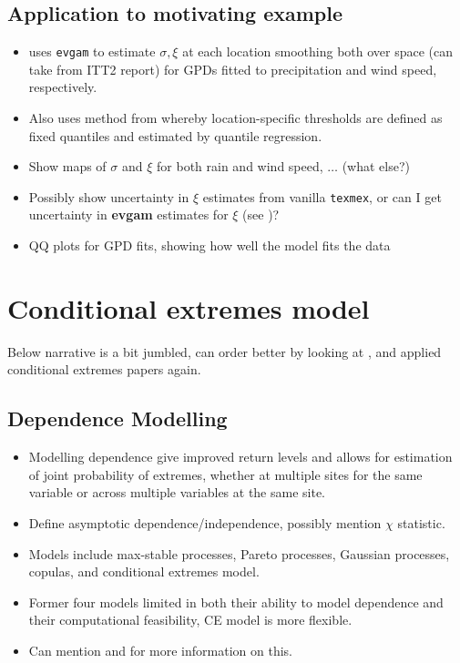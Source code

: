 \documentclass{article}
\numberwithin{equation}{section}
\begin{document}
\subsection{Application to motivating example}
\begin{itemize}
  \item uses \texttt{evgam} to estimate $\sigma, \xi$ at each location smoothing both over space (can take from ITT2 report) for GPDs fitted to precipitation and wind speed, respectively.
  \item Also uses method from \cite{Youngman2019} whereby location-specific thresholds are defined as fixed quantiles and estimated by quantile regression.
  \item Show maps of $\sigma$ and $\xi$ for both rain and wind speed, $\ldots$ (what else?)
  \item Possibly show uncertainty in $\xi$ estimates from vanilla \texttt{texmex}, or can I get uncertainty in \textbf{evgam} estimates for $\xi$ (see \cite{Youngman2023})?
  \item QQ plots for GPD fits, showing how well the model fits the data 
\end{itemize}

\section{Conditional extremes model}\label{sec:ce}

Below narrative is a bit jumbled, can order better by looking at \cite{Heffernan2004}, \cite{Keef2013} and applied conditional extremes papers again. 

\subsection{Dependence Modelling}
\begin{itemize}
  \item Modelling dependence give improved return levels and allows for estimation of joint probability of extremes, whether at multiple sites for the same variable or across multiple variables at the same site.
  \item Define asymptotic dependence/independence, possibly mention $\chi$ statistic. 
  \item Models include max-stable processes, Pareto processes, Gaussian processes, copulas, and conditional extremes model.
  \item Former four models limited in both their ability to model dependence and their computational feasibility, CE model is more flexible.
  \item Can mention \cite{Tawn2018} and \cite{Huser2024} for more information on this.
\end{itemize}
\end{document}
